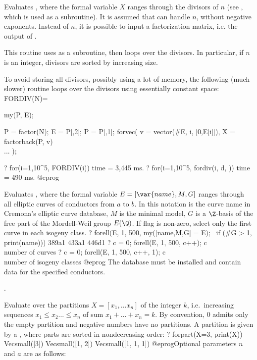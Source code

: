 \label{se:fordiv}
Evaluates , where
the formal variable $X$ ranges through the divisors of $n$
(see , which is used as a subroutine). It is assumed that
 can handle $n$, without negative exponents. Instead of $n$,
it is possible to input a factorization matrix, i.e. the output of
.

This routine uses  as a subroutine, then loops over the
divisors. In particular, if $n$ is an integer, divisors are sorted by
increasing size.

To avoid storing all divisors, possibly using a lot of memory, the following
(much slower) routine loops over the divisors using essentially constant
space:
\bprog
FORDIV(N)=
{ my(P, E);

  P = factor(N); E = P[,2]; P = P[,1];
  forvec( v = vector(#E, i, [0,E[i]]),
  X = factorback(P, v)
  \\ ...
);
}
? for(i=1,10^5, FORDIV(i))
time = 3,445 ms.
? for(i=1,10^5, fordiv(i, d, ))
time = 490 ms.
@eprog

\label{se:forell}
Evaluates , where the formal variable $E = [\var{name}, M, G]$
ranges through all elliptic curves of conductors from $a$ to $b$. In this
notation  is the curve name in Cremona's elliptic  curve  database,
$M$ is the minimal model, $G$ is a $\Z$-basis of the free part of the
Mordell-Weil group $E(\Q)$. If flag is non-zero, select
only the first curve in each isogeny class.
\bprog
? forell(E, 1, 500, my([name,M,G] = E); \
    if (#G > 1, print(name)))
389a1
433a1
446d1
? c = 0; forell(E, 1, 500, c++); c   \\ number of curves
? c = 0; forell(E, 1, 500, c++, 1); c \\ number of isogeny classes
@eprog\noindent
The  database must be installed and contain data for the
specified conductors.

.

\label{se:forpart}
Evaluate \var{seq} over the partitions $X=[x_1,\dots x_n]$ of the
integer $k$, i.e.~increasing sequences $x_1\leq x_2\dots \leq x_n$ of sum
$x_1+\dots + x_n=k$. By convention, $0$ admits only the empty partition and
negative numbers have no partitions. A partition is given by a
, where parts are sorted in nondecreasing order:
\bprog
? forpart(X=3, print(X))
Vecsmall([3])
Vecsmall([1, 2])
Vecsmall([1, 1, 1])
@eprog\noindent Optional parameters $n$ and $a$ are as follows:

